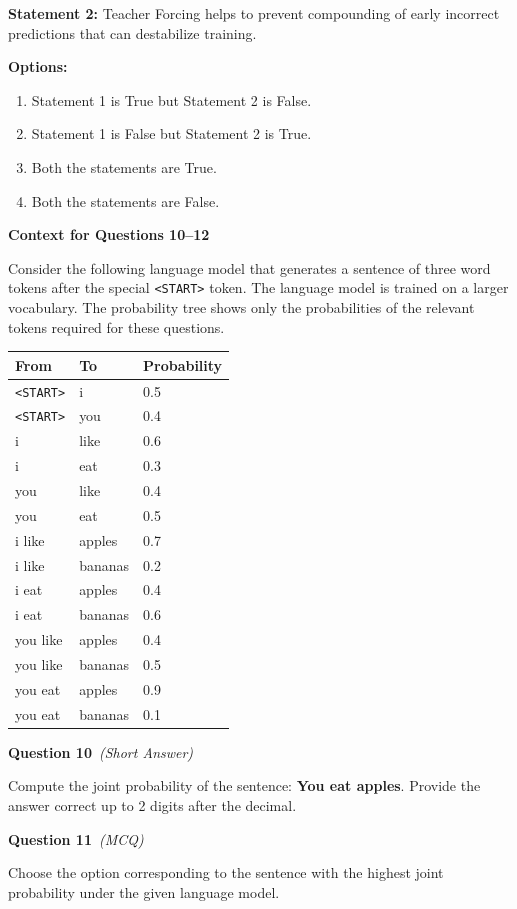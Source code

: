 \documentclass[11pt]{article}
\newcommand{\q}[2]{\vspace{0.5em}\noindent\textbf{Question #1}\if\relax\detokenize{#2}\relax\else\ \textit{(#2)}\fi\par}
\newcommand{\opts}{\textbf{Options:}}
\newcommand{\contexthead}[1]{\vspace{0.6em}\noindent\textbf{Context for Questions #1}\par}
\begin{document}
\textbf{Statement 2:} Teacher Forcing helps to prevent compounding of early incorrect predictions that can destabilize training.

\opts
\begin{enumerate}[label=(\alph*)]
\item Statement 1 is True but Statement 2 is False.
\item Statement 1 is False but Statement 2 is True.
\item Both the statements are True.
\item Both the statements are False.
\end{enumerate}

\contexthead{10--12}
Consider the following language model that generates a sentence of three word tokens after the special \texttt{<START>} token. The language model is trained on a larger vocabulary. The probability tree shows only the probabilities of the relevant tokens required for these questions.

\begin{center}
\begin{tabular}{lll}
\toprule
From & To & Probability\\
\midrule
\texttt{<START>} & i & 0.5\\
\texttt{<START>} & you & 0.4\\
i & like & 0.6\\
i & eat & 0.3\\
you & like & 0.4\\
you & eat & 0.5\\
i like & apples & 0.7\\
i like & bananas & 0.2\\
i eat & apples & 0.4\\
i eat & bananas & 0.6\\
you like & apples & 0.4\\
you like & bananas & 0.5\\
you eat & apples & 0.9\\
you eat & bananas & 0.1\\
\bottomrule
\end{tabular}
\end{center}

\q{10}{Short Answer}
Compute the joint probability of the sentence: \textbf{You eat apples}. Provide the answer correct up to 2 digits after the decimal.

\q{11}{MCQ}
Choose the option corresponding to the sentence with the highest joint probability under the given language model.
\end{document}
